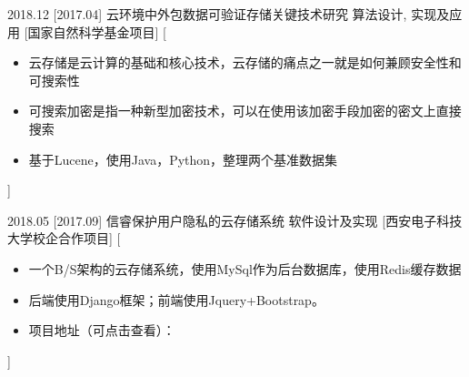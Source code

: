 \documentclass[zh]{resume}
\begin{document}
\begin{experiences}
  \experience
    {2018.12}%
    [2017.04]%
    {云环境中外包数据可验证存储关键技术研究}%
    {算法设计, 实现及应用}%
    [国家自然科学基金项目]%
    [\begin{itemize}
      \item{\icon{\faFlag}} 云存储是云计算的基础和核心技术，云存储的痛点之一就是如何兼顾安全性和可搜索性
      \item{\icon{\faFlag}} 可搜索加密是指一种新型加密技术，可以在使用该加密手段加密的密文上直接搜索
      \item{\icon{\faCheck}} 基于Lucene，使用Java，Python，整理两个基准数据集  %
    \end{itemize}]%

  \separator{0.2em}
%


  \separator{0.2em}
  \experience
    {2018.05}%
    [2017.09]%
    {信睿保护用户隐私的云存储系统}%
    {软件设计及实现}%
    [西安电子科技大学校企合作项目]%
    [\begin{itemize}
      \item{\icon{\faFlag}} 一个B/S架构的云存储系统，使用MySql作为后台数据库，使用Redis缓存数据
      \item{\icon{\faFlag}} 后端使用Django框架；前端使用Jquery+Bootstrap。
      \item{\icon{\faCheck}} 项目地址（可点击查看）： 
    \end{itemize}]%




\end{experiences}
\end{document}
